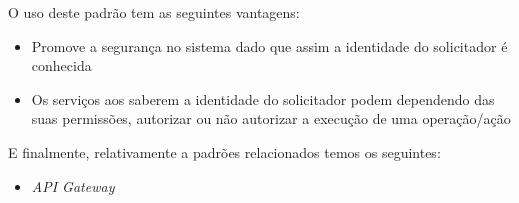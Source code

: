 O uso deste padrão tem as seguintes vantagens:
\begin{itemize}
    \item Promove a segurança no sistema dado que assim a identidade do solicitador é conhecida \cite{accessTokenPattern}
    \item Os serviços aos saberem a identidade do solicitador podem dependendo das suas permissões, autorizar ou não autorizar a execução de uma operação/ação \cite{accessTokenPattern}
\end{itemize}

E finalmente, relativamente a padrões relacionados temos os seguintes:
\begin{itemize}
    \item \textit{API Gateway}
\end{itemize}